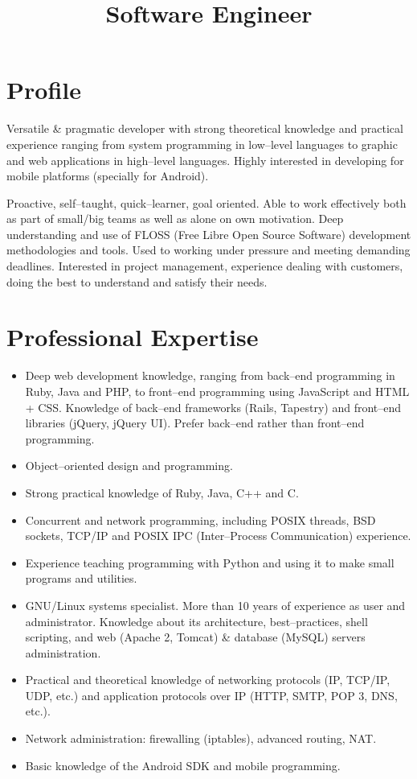 \documentclass[11pt,a4paper]{moderncv}
\title{Software Engineer}
\begin{document}
\maketitle

\section{Profile}
Versatile \& pragmatic developer with strong theoretical knowledge and
practical experience ranging from system programming in low--level languages to
graphic and web applications in high--level languages. Highly interested in
developing for mobile platforms (specially for Android).

Proactive, self--taught, quick--learner, goal oriented. Able to work
effectively both as part of small/big teams as well as alone on own motivation.
Deep understanding and use of FLOSS (Free Libre Open Source Software)
development methodologies and tools. Used to working under pressure and meeting
demanding deadlines. Interested in project management, experience dealing with
customers, doing the best to understand and satisfy their needs.

\section{Professional Expertise}
\begin{itemize}
\item Deep web development knowledge, ranging from back--end programming in
Ruby, Java and PHP, to front--end programming using JavaScript and HTML + CSS.
Knowledge of back--end frameworks (Rails, Tapestry) and front--end libraries
(jQuery, jQuery UI). Prefer back--end rather than front--end programming.
\item Object--oriented design and programming.
\item Strong practical knowledge of Ruby, Java, C++ and C.
\item Concurrent and network programming, including POSIX threads, BSD sockets,
  TCP/IP and POSIX IPC (Inter--Process Communication) experience.
\item Experience teaching programming with Python and using it to make small
  programs and utilities.
\item GNU/Linux systems specialist. More than 10 years of experience as user
  and administrator. Knowledge about its architecture, best--practices, shell
  scripting,  and web (Apache 2, Tomcat) \& database (MySQL) servers
  administration.
\item Practical and theoretical knowledge of networking protocols (IP, TCP/IP,
  UDP, etc.) and application protocols over IP (HTTP, SMTP, POP 3, DNS, etc.).
\item Network administration: firewalling (iptables), advanced routing, NAT.
\item Basic knowledge of the Android SDK and mobile programming.
\end{itemize}
\end{document}

